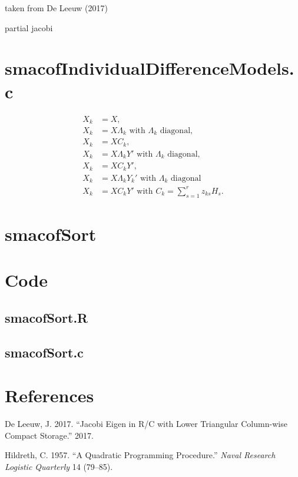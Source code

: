 \documentclass[
  12pt,
]{article}
\newenvironment{Shaded}{\begin{snugshade}}{\end{snugshade}}
\newlength{\cslhangindent}
\newenvironment{CSLReferences}[2] %
 {\begin{list}{}{%
  \setlength{\itemindent}{0pt}
  \setlength{\leftmargin}{0pt}
  \setlength{\parsep}{0pt}
  \ifodd #1
   \setlength{\leftmargin}{\cslhangindent}
   \setlength{\itemindent}{-1\cslhangindent}
  \fi
  \setlength{\itemsep}{#2\baselineskip}}}
 {\end{list}}
\begin{document}
taken from De Leeuw (2017)

partial jacobi

\section{smacofIndividualDifferenceModels.c}\label{smacofindividualdifferencemodels.c}

\begin{align}
X_k&=X,\\
X_k&=X\Lambda_k \text{ with }\Lambda_k\text{ diagonal},\\
X_k&=XC_k,\\
X_k&=X\Lambda_k Y' \text{ with }\Lambda_k\text{ diagonal},\\
X_k&=XC_kY',\\
X_k&=X\Lambda_k Y_k'\text{ with }\Lambda_k\text{ diagonal}\\
X_k&=XC_k Y'\text{ with } C_k=\sum_{s=1}^r z_{ks}H_s.
\end{align}

\section{smacofSort}\label{smacofsort}

\section{Code}\label{code}

\subsection{smacofSort.R}\label{smacofsort.r}

\subsection{smacofSort.c}\label{smacofsort.c}

\begin{Shaded}
\begin{Highlighting}[]

\end{Highlighting}
\end{Shaded}

\section*{References}\label{references}

\label{refs}
\begin{CSLReferences}{1}{0}
De Leeuw, J. 2017. {``{Jacobi Eigen in R/C with Lower Triangular Column-wise Compact Storage}.''} 2017.

Hildreth, C. 1957. {``{A Quadratic Programming Procedure}.''} \emph{Naval Research Logistic Quarterly} 14 (79--85).

\end{CSLReferences}
\end{document}
